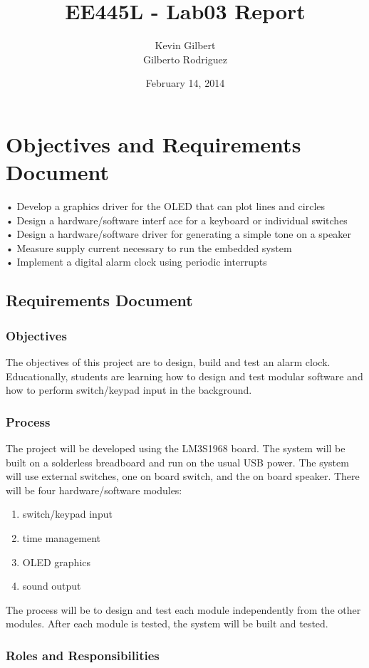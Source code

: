\documentclass[twoside]{article}
\title{EE445L - Lab03 Report}
\author{Kevin Gilbert\\Gilberto Rodriguez}
\date{February 14, 2014}
\begin{document}
\maketitle{}

\section*{Objectives and Requirements Document}
 • Develop a graphics driver for the OLED that can plot lines and circles\\
• Design a hardware/software interf
ace for a keyboard or individual switches\\
• Design a hardware/software driver for generating a simple tone on a speaker\\
• Measure supply current necessary to run the embedded system\\
• Implement a digital alarm clock using periodic interrupts\\
\subsection{Requirements Document}

\subsubsection{Objectives}
The objectives of this project are to design, build and test an alarm clock. Educationally, students are learning how to design and test modular software and how to perform switch/keypad input in the background.
\subsubsection{Process} 
The project will be developed using the LM3S1968 board. The system will be built on a solderless breadboard and run on the usual USB power. The system will use external switches, one on board switch, and the on board speaker. There will be four hardware/software modules: 
\begin{enumerate}
\item switch/keypad input
\item time management
\item OLED graphics 
\item sound output
\end{enumerate}
The process will be to design and test each module independently from the other modules. After each
module is tested, the system will be built and tested.
\subsubsection{Roles and Responsibilities} 
\end{document}
